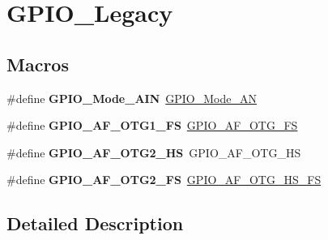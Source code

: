 \hypertarget{group___g_p_i_o___legacy}{}\section{G\+P\+I\+O\+\_\+\+Legacy}
\label{group___g_p_i_o___legacy}
\subsection*{Macros}
\begin{DoxyCompactItemize}
\item 
\mbox{\label{group___g_p_i_o___legacy_gadf4dafa8caa4e91d2bee996c4bfdf8cc}} 
\#define {\bfseries G\+P\+I\+O\+\_\+\+Mode\+\_\+\+A\+IN}~\mbox{\hyperlink{group___g_p_i_o_gga1347339e1c84a196fabbb31205eec5d4a6e5c0d7e6d2e22b834b24e1ca1d6d0db}{G\+P\+I\+O\+\_\+\+Mode\+\_\+\+AN}}
\item 
\mbox{\label{group___g_p_i_o___legacy_gaddd737997abcd1154c0998b22333b579}} 
\#define {\bfseries G\+P\+I\+O\+\_\+\+A\+F\+\_\+\+O\+T\+G1\+\_\+\+FS}~\mbox{\hyperlink{group___g_p_i_o___alternat__function__selection__define_gaeba0aeefec841e505170efc7762ae588}{G\+P\+I\+O\+\_\+\+A\+F\+\_\+\+O\+T\+G\+\_\+\+FS}}
\item 
\mbox{\label{group___g_p_i_o___legacy_ga54715298b3dc7e843429fd3e24d42cd4}} 
\#define {\bfseries G\+P\+I\+O\+\_\+\+A\+F\+\_\+\+O\+T\+G2\+\_\+\+HS}~G\+P\+I\+O\+\_\+\+A\+F\+\_\+\+O\+T\+G\+\_\+\+HS
\item 
\mbox{\label{group___g_p_i_o___legacy_ga85e574d8321b9d9aaa2790351b4f0c1e}} 
\#define {\bfseries G\+P\+I\+O\+\_\+\+A\+F\+\_\+\+O\+T\+G2\+\_\+\+FS}~\mbox{\hyperlink{group___g_p_i_o___alternat__function__selection__define_ga5f30e17f7328fa05e6dd8b799ae5e6ee}{G\+P\+I\+O\+\_\+\+A\+F\+\_\+\+O\+T\+G\+\_\+\+H\+S\+\_\+\+FS}}
\end{DoxyCompactItemize}


\subsection{Detailed Description}
